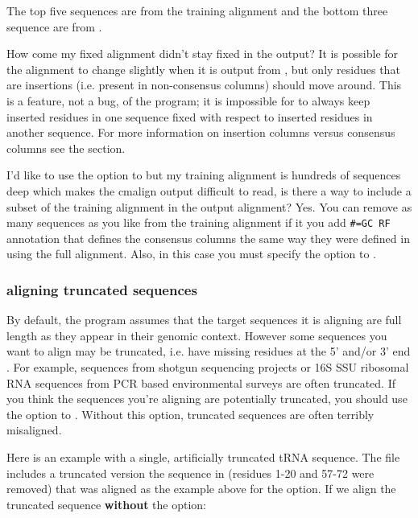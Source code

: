 The top five sequences are from the training alignment 
and the bottom three sequence are from .

\begin{srefaq}{How come my fixed alignment didn't stay fixed in the
 output?} It is possible for the  alignment
to change slightly when it is output from , but only
residues that are insertions (i.e. present in non-consensus columns)
should move around. This is a feature, not a bug, of the program; it is
impossible for  to always keep inserted residues in one sequence fixed
with respect to inserted residues in another sequence. For more
information on insertion columns versus consensus columns see the
 section.
\end{srefaq}

\begin{srefaq}{I'd like to use the  option to  
     but my training alignment is hundreds of sequences deep
    which makes the cmalign output difficult to read, is there a way
    to include a subset of the training alignment in the output
    alignment?} Yes.  You can remove as many sequences as you like
    from the training alignment if it you add {\small\verb+#=GC RF+}
    annotation that defines the consensus columns the same way they
    were defined in  using the full alignment. Also, in
    this case you must specify the  option to
    .
  \end{srefaq}

\subsubsection{aligning truncated sequences}
By default, the  program assumes that the target
sequences it is aligning are full length as they appear in their genomic
context. However some sequences you want to align may be truncated,
i.e.  have missing residues at the 5' and/or 3' end . For example,
sequences from shotgun sequencing projects or 16S SSU ribosomal RNA
sequences from PCR based environmental surveys are often truncated. If
you think the sequences you're aligning are potentially truncated, you
should use the  option to . Without this
option, truncated sequences are often terribly misaligned.

Here is an example with a single, artificially truncated tRNA
sequence. The file  includes a truncated
version the sequence in  (residues 1-20 and 57-72
were removed) that was aligned as the example above for 
the  option. If we align the truncated sequence
\textbf{without} the  option: 

